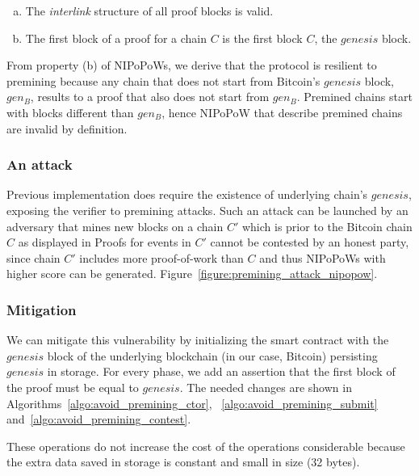 
\begin{enumerate}[(a)]

\item The \emph{interlink} structure of all proof blocks is valid.

\item The first block of a proof for a chain $C$ is the first block $C$, the
    $genesis$ block.

\end{enumerate}

From property (b) of NIPoPoWs, we derive that the protocol is resilient to
premining because any chain that does not start from Bitcoin's $genesis$ block,
$gen_{B}$, results to a proof that also does not start from $gen_{B}$. Premined
chains start with blocks different than $gen_{B}$, hence NIPoPoW that describe
premined chains are invalid by definition.

\subsubsection{An attack} Previous implementation does require the existence of
underlying chain's $genesis$, exposing the verifier to premining attacks. Such
an attack can be launched by an adversary that mines new blocks on a chain $C'$
which is prior to the Bitcoin chain $C$ as displayed in
 Proofs for events in $C'$ cannot
be contested by an honest party, since chain $C'$ includes more proof-of-work
than $C$ and thus NIPoPoWs with higher score can be generated.
Figure~\ref{figure:premining_attack_nipopow}.

\subsubsection{Mitigation}

We can mitigate this vulnerability by initializing the smart contract with the
$genesis$ block of the underlying blockchain (in our case, Bitcoin) persisting
$genesis$ in storage. For every phase, we add an assertion that the first block
of the proof must be equal to $genesis$. The needed changes are shown in
Algorithms~\ref{algo:avoid_premining_ctor}, ~\ref{algo:avoid_premining_submit}
and~\ref{algo:avoid_premining_contest}.

These operations do not increase the cost of the operations considerable
because the extra data saved in storage is constant and small in size (32
bytes).

